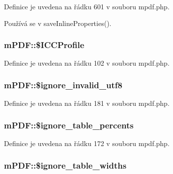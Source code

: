 Definice je uvedena na řádku 601 v souboru mpdf.\-php.



Používá se v save\-Inline\-Properties().

\hypertarget{classm_p_d_f_acac3cd5b009e546a31f7055c7988654e}{
\subsubsection[{\$\-I\-C\-C\-Profile}]{\setlength{\rightskip}{0pt plus 5cm}m\-P\-D\-F\-::\$\-I\-C\-C\-Profile}}\label{classm_p_d_f_acac3cd5b009e546a31f7055c7988654e}


Definice je uvedena na řádku 102 v souboru mpdf.\-php.

\hypertarget{classm_p_d_f_a954b8d8b9df5b7ddfad5e1baf230b071}{
\subsubsection[{\$ignore\-\_\-invalid\-\_\-utf8}]{\setlength{\rightskip}{0pt plus 5cm}m\-P\-D\-F\-::\$ignore\-\_\-invalid\-\_\-utf8}}\label{classm_p_d_f_a954b8d8b9df5b7ddfad5e1baf230b071}


Definice je uvedena na řádku 181 v souboru mpdf.\-php.

\hypertarget{classm_p_d_f_ae94526b3ad15593dc6f68963af27dfbe}{
\subsubsection[{\$ignore\-\_\-table\-\_\-percents}]{\setlength{\rightskip}{0pt plus 5cm}m\-P\-D\-F\-::\$ignore\-\_\-table\-\_\-percents}}\label{classm_p_d_f_ae94526b3ad15593dc6f68963af27dfbe}


Definice je uvedena na řádku 172 v souboru mpdf.\-php.

\hypertarget{classm_p_d_f_a14c51b32c35d54e9891759b00bc884f7}{
\subsubsection[{\$ignore\-\_\-table\-\_\-widths}]{\setlength{\rightskip}{0pt plus 5cm}m\-P\-D\-F\-::\$ignore\-\_\-table\-\_\-widths}}\label{classm_p_d_f_a14c51b32c35d54e9891759b00bc884f7}


